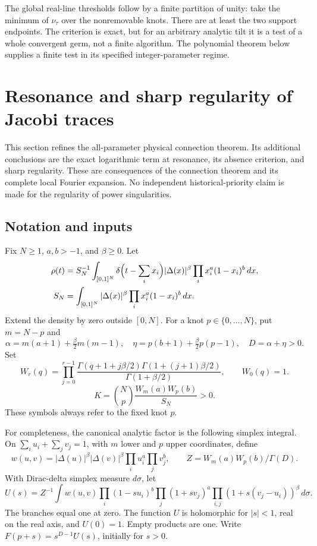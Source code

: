\documentclass[11pt,a4paper]{article}
\theoremstyle{definition}
\theoremstyle{remark}
\numberwithin{equation}{section}
\begin{document}
The global real-line thresholds follow by a finite partition of unity:
take the minimum of $\nu_\tau$ over the nonremovable knots. There are
at least the two support endpoints. The criterion is exact, but for
an arbitrary analytic tilt it is a test of a whole convergent germ,
not a finite algorithm. The polynomial theorem below supplies a finite
test in its specified integer-parameter regime.



\section{Resonance and sharp regularity of Jacobi traces}
\label{p9:sec:JR}

This section refines the all-parameter physical connection theorem.
Its additional conclusions are the exact logarithmic term at resonance,
its absence criterion, and sharp regularity. These are consequences of
the connection theorem and its complete local Fourier expansion. No
independent historical-priority claim is made for the regularity of
power singularities.

\subsection{Notation and inputs}

Fix \(N\ge1\), \(a,b>-1\), and \(\beta\ge0\). Let
\begin{align*}
 \rho(t)&=S_N^{-1}\int_{[0,1]^N}
 \delta\Bigl(t-\sum_i x_i\Bigr)|\Delta(x)|^\beta
             \prod_i x_i^a(1-x_i)^b\,dx,\\
 S_N&=\int_{[0,1]^N}|\Delta(x)|^\beta
             \prod_i x_i^a(1-x_i)^b\,dx .
\end{align*}
Extend the density by zero outside \([0,N]\). For a knot
\(p\in\{0,\ldots,N\}\), put \(m=N-p\) and
\[
 \alpha=m(a+1)+\tfrac{\beta}{2}m(m-1),\quad
 \eta=p(b+1)+\tfrac{\beta}{2}p(p-1),\quad D=\alpha+\eta>0.
\]
Set
\[
 W_r(q)=\prod_{j=0}^{r-1}
 \frac{\Gamma(q+1+j\beta/2)\Gamma(1+(j+1)\beta/2)}
 {\Gamma(1+\beta/2)},\qquad W_0(q)=1.
\]
\[
 K=\binom Np\frac{W_m(a)W_p(b)}{S_N}>0.
\]
These symbols always refer to the fixed knot \(p\).

For completeness, the canonical analytic factor is the following
simplex integral. On \(\sum_i u_i+\sum_jv_j=1\), with \(m\) lower and
\(p\) upper coordinates, define
\[
 w(u,v)=|\Delta(u)|^\beta|\Delta(v)|^\beta
                  \prod_i u_i^a\prod_jv_j^b,\qquad
 Z=W_m(a)W_p(b)/\Gamma(D).
\]
With Dirac-delta simplex measure \(d\sigma\), let
\[
 U(s)=Z^{-1}\int w(u,v)
 \prod_i(1-su_i)^b\prod_j(1+sv_j)^a
 \prod_{i,j}(1+s(v_j-u_i))^\beta\,d\sigma .
\]
The branches equal one at zero. The function \(U\) is holomorphic for
\(|s|<1\), real on the real axis, and \(U(0)=1\). Empty products are one.
Write \(F(p+s)=s^{D-1}U(s)\), initially for \(s>0\).
\end{document}
